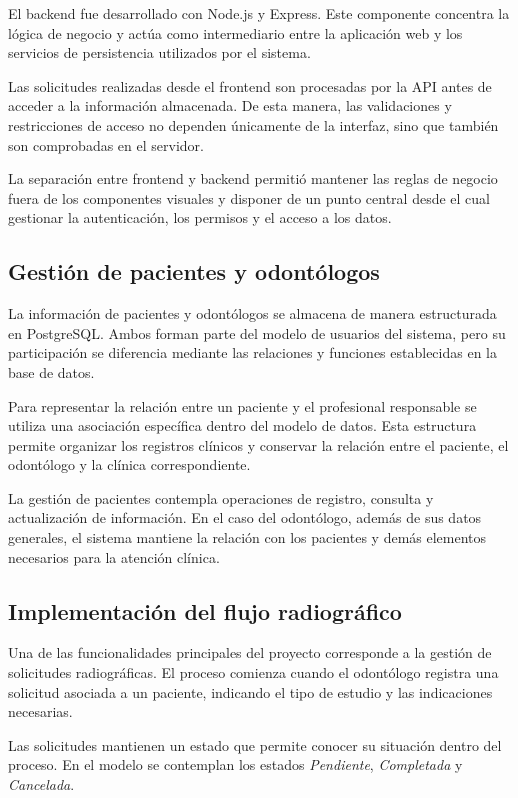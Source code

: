 El backend fue desarrollado con Node.js y Express. Este componente concentra
la lógica de negocio y actúa como intermediario entre la aplicación web y los
servicios de persistencia utilizados por el sistema.

Las solicitudes realizadas desde el frontend son procesadas por la API antes
de acceder a la información almacenada. De esta manera, las validaciones y
restricciones de acceso no dependen únicamente de la interfaz, sino que
también son comprobadas en el servidor.

La separación entre frontend y backend permitió mantener las reglas de negocio
fuera de los componentes visuales y disponer de un punto central desde el cual
gestionar la autenticación, los permisos y el acceso a los datos.

\subsection{Gestión de pacientes y odontólogos}

La información de pacientes y odontólogos se almacena de manera estructurada
en PostgreSQL. Ambos forman parte del modelo de usuarios del sistema, pero su
participación se diferencia mediante las relaciones y funciones establecidas
en la base de datos.

Para representar la relación entre un paciente y el profesional responsable
se utiliza una asociación específica dentro del modelo de datos. Esta
estructura permite organizar los registros clínicos y conservar la relación
entre el paciente, el odontólogo y la clínica correspondiente.

La gestión de pacientes contempla operaciones de registro, consulta y
actualización de información. En el caso del odontólogo, además de sus datos
generales, el sistema mantiene la relación con los pacientes y demás elementos
necesarios para la atención clínica.

\subsection{Implementación del flujo radiográfico}

Una de las funcionalidades principales del proyecto corresponde a la gestión
de solicitudes radiográficas. El proceso comienza cuando el odontólogo
registra una solicitud asociada a un paciente, indicando el tipo de estudio y
las indicaciones necesarias.

Las solicitudes mantienen un estado que permite conocer su situación dentro
del proceso. En el modelo se contemplan los estados \textit{Pendiente},
\textit{Completada} y \textit{Cancelada}.

